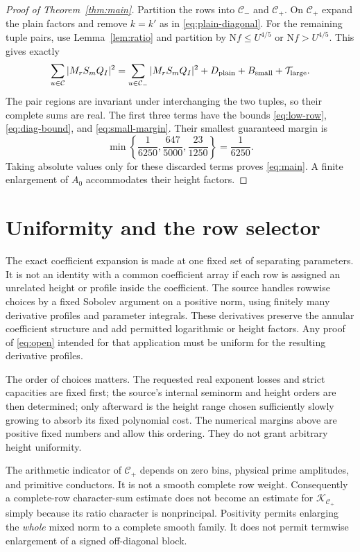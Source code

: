 \documentclass[11pt]{article}
\theoremstyle{definition}
\theoremstyle{remark}
\numberwithin{equation}{section}
\newcommand{\Nm}{\mathrm N}
\newcommand{\CC}{\mathcal C}
\newcommand{\Tlarge}{\mathcal T_{\mathrm{large}}}
\begin{document}
\begin{proof}[Proof of Theorem~\ref{thm:main}]
Partition the rows into $\CC_-$ and $\CC_+$. On $\CC_+$ expand the
plain factors and remove $k=k'$ as in \eqref{eq:plain-diagonal}.
For the remaining tuple pairs, use Lemma~\ref{lem:ratio} and partition
by $\Nm f\le U^{4/5}$ or $\Nm f>U^{4/5}$. This gives exactly
\[
\sum_{u\in\CC}|M_rS_mQ_I|^2
=\sum_{u\in\CC_-}|M_rS_mQ_I|^2
+D_{\rm plain}+B_{\rm small}+\Tlarge.
\]
The pair regions are invariant under interchanging the two tuples,
so their complete sums are real. The first three terms have the
bounds \eqref{eq:low-row}, \eqref{eq:diag-bound}, and
\eqref{eq:small-margin}. Their smallest guaranteed margin is
\[
\min\left\{\frac1{6250},\frac{647}{5000},\frac{23}{1250}\right\}
=\frac1{6250}.
\]
Taking absolute values only for these discarded terms proves
\eqref{eq:main}. A finite enlargement of $A_0$ accommodates their
height factors.
\end{proof}

\section{Uniformity and the row selector}\label{sec:uniformity}

The exact coefficient expansion is made at one fixed set of separating
parameters. It is not an identity with a common coefficient array if
each row is assigned an unrelated height or profile inside the
coefficient. The source handles rowwise choices by a fixed Sobolev
argument on a positive norm, using finitely many derivative profiles
and parameter integrals. These derivatives preserve the annular
coefficient structure and add permitted logarithmic or height factors.
Any proof of \eqref{eq:open} intended for that application must be
uniform for the resulting derivative profiles.

The order of choices matters. The requested real exponent losses and
strict capacities are fixed first; the source's internal seminorm and
height orders are then determined; only afterward is the height range
chosen sufficiently slowly growing to absorb its fixed polynomial cost.
The numerical margins above are positive fixed numbers and allow this
ordering. They do not grant arbitrary height uniformity.

The arithmetic indicator of $\CC_+$ depends on zero bins, physical
prime amplitudes, and primitive conductors. It is not a smooth complete
row weight. Consequently a complete-row character-sum estimate does
not become an estimate for $\mathcal K_{\CC_+}$ simply because its
ratio character is nonprincipal. Positivity permits enlarging the
\emph{whole} mixed norm to a complete smooth family. It does not permit
termwise enlargement of a signed off-diagonal block.
\end{document}
